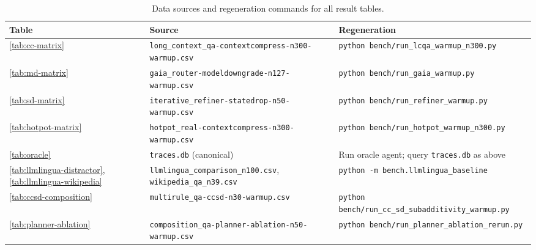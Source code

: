 \documentclass[sigconf,9pt]{acmart}
\begin{document}
\begin{table}[h]
\caption{Data sources and regeneration commands for all result tables.}
\label{tab:repro}
\small
\begin{tabularx}{\linewidth}{p{0.5cm} >{\raggedright\arraybackslash}X >{\raggedright\arraybackslash}X}
\toprule
Table & Source & Regeneration \\
\midrule

\ref{tab:cc-matrix} &
\texttt{long\_\allowbreak context\_\allowbreak qa-\allowbreak contextcompress-\allowbreak n300-\allowbreak warmup.csv} &
\texttt{python bench/run\_\allowbreak lcqa\_\allowbreak warmup\_\allowbreak n300.py} \\

\addlinespace
\ref{tab:md-matrix} &
\texttt{gaia\_\allowbreak router-\allowbreak modeldowngrade-\allowbreak n127-\allowbreak warmup.csv} &
\texttt{python bench/run\_\allowbreak gaia\_\allowbreak warmup.py} \\

\addlinespace
\ref{tab:sd-matrix} &
\texttt{iterative\_\allowbreak refiner-\allowbreak statedrop-\allowbreak n50-\allowbreak warmup.csv} &
\texttt{python bench/run\_\allowbreak refiner\_\allowbreak warmup.py} \\

\addlinespace
\ref{tab:hotpot-matrix} &
\texttt{hotpot\_\allowbreak real-\allowbreak contextcompress-\allowbreak n300-\allowbreak warmup.csv} &
\texttt{python bench/run\_\allowbreak hotpot\_\allowbreak warmup\_\allowbreak n300.py} \\

\addlinespace
\ref{tab:oracle} &
\texttt{traces.db} (canonical) &
Run oracle agent; query \texttt{traces.db} as above \\

\addlinespace
\ref{tab:llmlingua-distractor}, \ref{tab:llmlingua-wikipedia} &
\texttt{llmlingua\_\allowbreak comparison\_\allowbreak n100.csv},
\texttt{wikipedia\_\allowbreak qa\_\allowbreak n39.csv} &
\texttt{python -m bench.llmlingua\_\allowbreak baseline} \\

\addlinespace
\ref{tab:ccsd-composition} &
\texttt{multirule\_\allowbreak qa-\allowbreak ccsd-\allowbreak n30-\allowbreak warmup.csv} &
\texttt{python bench/run\_\allowbreak cc\_\allowbreak sd\_\allowbreak subadditivity\_\allowbreak warmup.py} \\

\addlinespace
\ref{tab:planner-ablation} &
\texttt{composition\_\allowbreak qa-\allowbreak planner-\allowbreak ablation-\allowbreak n50-\allowbreak warmup.csv} &
\texttt{python bench/run\_\allowbreak planner\_\allowbreak ablation\_\allowbreak rerun.py} \\


\end{tabularx}
\end{table}
\end{document}
